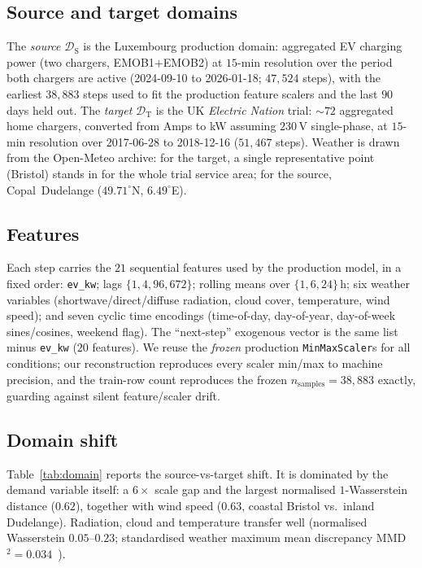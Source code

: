 \documentclass[conference]{IEEEtran}
\newcommand{\thesource}{\mathcal{D}_{\mathrm{S}}}
\newcommand{\thetarget}{\mathcal{D}_{\mathrm{T}}}
\begin{document}
\subsection{Source and target domains}
The \emph{source} $\thesource$ is the Luxembourg production domain: aggregated EV
charging power (two chargers, EMOB1$+$EMOB2) at $15$-min resolution over the
period both chargers are active (2024-09-10 to 2026-01-18; $47{,}524$ steps),
with the earliest $38{,}883$ steps used to fit the production feature scalers and
the last $90$ days held out. The \emph{target} $\thetarget$ is the UK
\emph{Electric Nation} trial: ${\sim}72$ aggregated home chargers, converted from
Amps to kW assuming $230$\,V single-phase, at $15$-min resolution over
2017-06-28 to 2018-12-16 ($51{,}467$ steps). Weather is drawn from the Open-Meteo
archive: for the target, a single representative point (Bristol) stands in for the
whole trial service area; for the source, Copal~Dudelange
($49.71^\circ$N, $6.49^\circ$E).

\subsection{Features}
Each step carries the $21$ sequential features used by the production model, in a
fixed order: \texttt{ev\_kw}; lags $\{1,4,96,672\}$; rolling means over
$\{1,6,24\}$\,h; six weather variables (shortwave/direct/diffuse radiation, cloud
cover, temperature, wind speed); and seven cyclic time encodings (time-of-day,
day-of-year, day-of-week sines/cosines, weekend flag). The ``next-step''
exogenous vector is the same list minus \texttt{ev\_kw} ($20$ features). We reuse
the \emph{frozen} production \texttt{MinMaxScaler}s for all conditions; our
reconstruction reproduces every scaler min/max to machine precision, and the
train-row count reproduces the frozen $n_{\mathrm{samples}}=38{,}883$ exactly,
guarding against silent feature/scaler drift.

\subsection{Domain shift}
Table~\ref{tab:domain} reports the source-vs-target shift. It is dominated by the
demand variable itself: a $6\times$ scale gap and the largest normalised
$1$-Wasserstein distance ($0.62$), together with wind speed ($0.63$, coastal
Bristol vs.\ inland Dudelange). Radiation, cloud and temperature transfer well
(normalised Wasserstein $0.05$--$0.23$; standardised weather maximum mean
discrepancy MMD$^2=0.034$~\cite{Gretton2012}).
\end{document}
